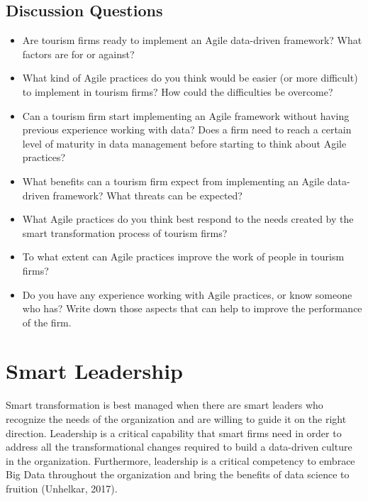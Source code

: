 \documentclass[
  letterpaper,
  DIV=11,
  numbers=noendperiod]{scrreprt}
\begin{document}
\hypertarget{discussion-questions-14}{%
\section{Discussion Questions}\label{discussion-questions-14}}

\begin{itemize}
\item
  Are tourism firms ready to implement an Agile data-driven framework?
  What factors are for or against?
\item
  What kind of Agile practices do you think would be easier (or more
  difficult) to implement in tourism firms? How could the difficulties
  be overcome?
\item
  Can a tourism firm start implementing an Agile framework without
  having previous experience working with data? Does a firm need to
  reach a certain level of maturity in data management before starting
  to think about Agile practices?
\item
  What benefits can a tourism firm expect from implementing an Agile
  data-driven framework? What threats can be expected?
\item
  What Agile practices do you think best respond to the needs created by
  the smart transformation process of tourism firms?
\item
  To what extent can Agile practices improve the work of people in
  tourism firms?
\item
  Do you have any experience working with Agile practices, or know
  someone who has? Write down those aspects that can help to improve the
  performance of the firm.
\end{itemize}

\hypertarget{smart-leadership}{%
\chapter{Smart Leadership}\label{smart-leadership}}

Smart transformation is best managed when there are smart leaders who
recognize the needs of the organization and are willing to guide it on
the right direction. Leadership is a critical capability that smart
firms need in order to address all the transformational changes required
to build a data-driven culture in the organization. Furthermore,
leadership is a critical competency to embrace Big Data throughout the
organization and bring the benefits of data science to fruition
(Unhelkar, 2017).
\end{document}
